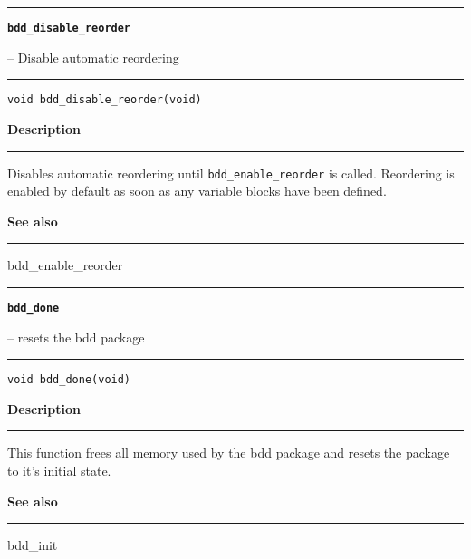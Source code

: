 \begin{minipage}{\textwidth}

\noindent\begin{minipage}{\textwidth}
\rule{\textwidth}{0.5mm}
{\tt\bf bdd\_disable\_reorder }
\--- Disable automatic reordering  \hspace{\fill}
\\\rule[1.5ex]{\textwidth}{0.5mm}
\end{minipage}

\noindent\begin{verbatim}
void bdd_disable_reorder(void) 
\end{verbatim}

\vspace{\parsep}\noindent
{\bf Description}\\\rule[1.5ex]{\textwidth}{0.2mm}\vspace{-1.5ex}\setlength{\parindent}{1em}
Disables automatic reordering until {\tt bdd\_enable\_reorder}
           is called. Reordering is enabled by default as soon as any variable
	   blocks have been defined. 

\vspace{\parsep}\vspace{\baselineskip}\noindent
{\bf See also}\\\rule[1.5ex]{\textwidth}{0.2mm}\vspace{-1.5ex}
bdd\_enable\_reorder 
\end{minipage}
\vspace{8ex}
\begin{minipage}{\textwidth}

\noindent\begin{minipage}{\textwidth}
\rule{\textwidth}{0.5mm}
{\tt\bf bdd\_done}
\--- resets the bdd package  \hspace{\fill}
\\\rule[1.5ex]{\textwidth}{0.5mm}
\end{minipage}

\noindent\begin{verbatim}
void bdd_done(void) 
\end{verbatim}

\vspace{\parsep}\noindent
{\bf Description}\\\rule[1.5ex]{\textwidth}{0.2mm}\vspace{-1.5ex}\setlength{\parindent}{1em}
This function frees all memory used by the bdd package and resets
         the package to it's initial state.

\vspace{\parsep}\vspace{\baselineskip}\noindent
{\bf See also}\\\rule[1.5ex]{\textwidth}{0.2mm}\vspace{-1.5ex}
bdd\_init 
\end{minipage}
